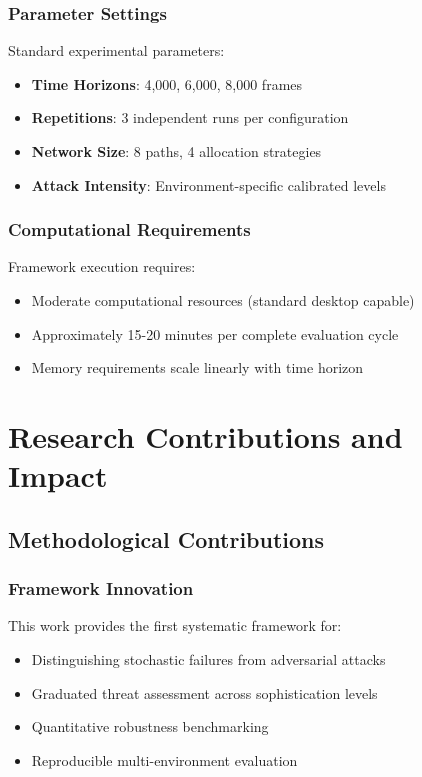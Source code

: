 \documentclass[11pt,a4paper]{article}
\begin{document}
\subsubsection{Parameter Settings}

Standard experimental parameters:

\begin{itemize}
\item \textbf{Time Horizons}: 4,000, 6,000, 8,000 frames
\item \textbf{Repetitions}: 3 independent runs per configuration
\item \textbf{Network Size}: 8 paths, 4 allocation strategies
\item \textbf{Attack Intensity}: Environment-specific calibrated levels
\end{itemize}

\subsubsection{Computational Requirements}

Framework execution requires:
\begin{itemize}
\item Moderate computational resources (standard desktop capable)
\item Approximately 15-20 minutes per complete evaluation cycle
\item Memory requirements scale linearly with time horizon
\end{itemize}

\section{Research Contributions and Impact}

\subsection{Methodological Contributions}

\subsubsection{Framework Innovation}

This work provides the first systematic framework for:
\begin{itemize}
\item Distinguishing stochastic failures from adversarial attacks
\item Graduated threat assessment across sophistication levels  
\item Quantitative robustness benchmarking
\item Reproducible multi-environment evaluation
\end{itemize}
\end{document}
